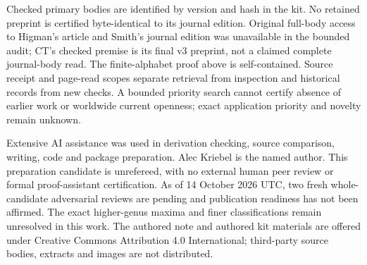 \documentclass[11pt]{article}
\begin{document}
Checked primary bodies are identified by version and hash in the kit. No retained preprint is certified byte-identical to its journal edition. Original full-body access to Higman's article and Smith's journal edition was unavailable in the bounded audit; CT's checked premise is its final v3 preprint, not a claimed complete journal-body read. The finite-alphabet proof above is self-contained. Source receipt and page-read scopes separate retrieval from inspection and historical records from new checks. A bounded priority search cannot certify absence of earlier work or worldwide current openness; exact application priority and novelty remain unknown.

Extensive AI assistance was used in derivation checking, source comparison, writing, code and package preparation. Alec Kriebel is the named author. This preparation candidate is unrefereed, with no external human peer review or formal proof-assistant certification. As of 14 October 2026 UTC, two fresh whole-candidate adversarial reviews are pending and publication readiness has not been affirmed. The exact higher-genus maxima and finer classifications remain unresolved in this work. The authored note and authored kit materials are offered under Creative Commons Attribution 4.0 International; third-party source bodies, extracts and images are not distributed.
\end{document}
